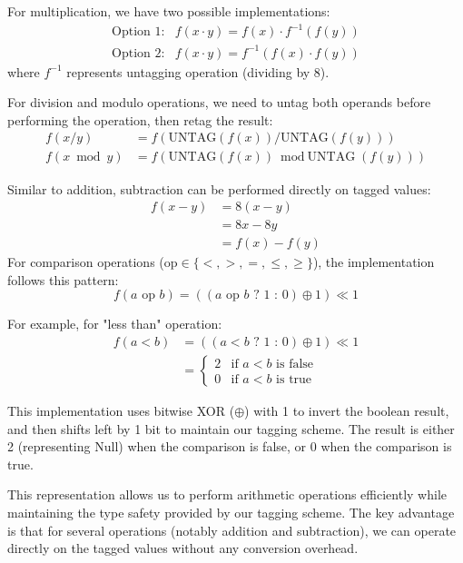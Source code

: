 \documentclass[12pt, a4paper]{article}
\begin{document}
For multiplication, we have two possible implementations:
\[
\begin{aligned}
\text{Option 1}: & f(x \cdot y) = f(x) \cdot f^{-1}(f(y)) \\
\text{Option 2}: & f(x \cdot y) = f^{-1}(f(x) \cdot f(y))
\end{aligned}
\]
where $f^{-1}$ represents untagging operation (dividing by 8).

For division and modulo operations, we need to untag both operands before performing the operation, then retag the result:
\[
\begin{aligned}
f(x / y) &= f(\text{UNTAG}(f(x)) / \text{UNTAG}(f(y))) \\
f(x \bmod y) &= f(\text{UNTAG}(f(x)) \bmod \text{UNTAG}(f(y)))
\end{aligned}
\]

Similar to addition, subtraction can be performed directly on tagged values:
\[
\begin{aligned}
f(x - y) &= 8(x - y) \\
&= 8x - 8y \\
&= f(x) - f(y)
\end{aligned}
\]
For comparison operations ($\text{op} \in \{<, >, =, \leq, \geq\}$), the implementation follows this pattern:
\[
f(a \text{ op } b) = ((a \text{ op } b \text{ ? } 1 \text{ : } 0) \oplus 1) \ll 1
\]

For example, for "less than" operation:
\[
\begin{aligned}
f(a < b) &= ((a < b \text{ ? } 1 \text{ : } 0) \oplus 1) \ll 1 \\
&= \begin{cases}
2 & \text{if } a < b \text{ is false} \\
0 & \text{if } a < b \text{ is true}
\end{cases}
\end{aligned}
\]

This implementation uses bitwise XOR ($\oplus$) with 1 to invert the boolean result, and then shifts left by 1 bit to maintain our tagging scheme. The result is either 2 (representing Null) when the comparison is false, or 0 when the comparison is true.


This representation allows us to perform arithmetic operations efficiently while maintaining the type safety provided by our tagging scheme. The key advantage is that for several operations (notably addition and subtraction), we can operate directly on the tagged values without any conversion overhead.
\end{document}
